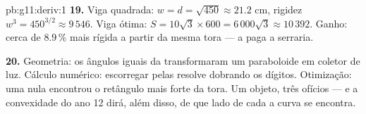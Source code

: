 \begin{solution}{pb:g11:deriv:1}
\textbf{19.} Viga quadrada: $w = d = \sqrt{450} \approx 21.2$
cm, rigidez $w^3 = 450^{3/2} \approx 9\,546$. Viga ótima:
$S = 10\sqrt3 \times 600 = 6\,000\sqrt3 \approx 10\,392$.
Ganho: cerca de $8.9\,\%$ mais rígida a partir da mesma tora
--- a  paga a serraria.

\textbf{20.} Geometria: os ângulos iguais da 
transformaram um paraboloide em coletor de luz. Cálculo
numérico: escorregar pelas  resolve  dobrando
os dígitos. Otimização: uma  nula encontrou o retângulo
mais forte da tora. Um objeto, três ofícios --- e a convexidade
do ano 12 dirá, além disso, de que lado de cada  a
curva se encontra.
\end{solution}
